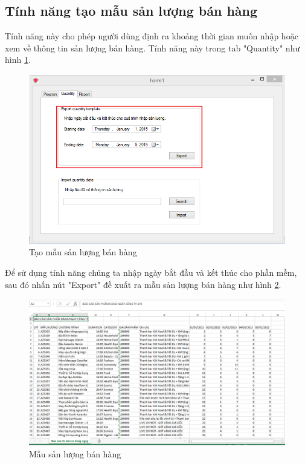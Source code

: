\documentclass[11pt]{article}
\begin{document}
\subsection{Tính năng tạo mẫu sản lượng bán hàng}
\indent Tính năng này cho phép người dùng định ra khoảng thời gian muốn nhập hoặc xem về thông tin sản lượng bán hàng. Tính năng này trong tab "Quantity" như hình \ref{exquantity}.\\
\begin{figure}[h!]
	\begin{center}
		\includegraphics[width=15cm]{exquantity.png}
	\end{center}
	\caption{Tạo mẫu sản lượng bán hàng}
	\label{exquantity}
\end{figure}
\indent Để sử dụng tính năng chúng ta nhập ngày bắt đầu và kết thúc cho phần mềm, sau đó nhấn nút "Export" đề xuất ra mẫu sản lượng bán hàng như hình \ref{mauquantity}.\\
\begin{figure}[h!]
	\begin{center}
		\includegraphics[width=15cm]{mauquantity.png}
	\end{center}
	\caption{Mẫu sản lượng bán hàng}
	\label{mauquantity}
\end{figure}
\end{document}
